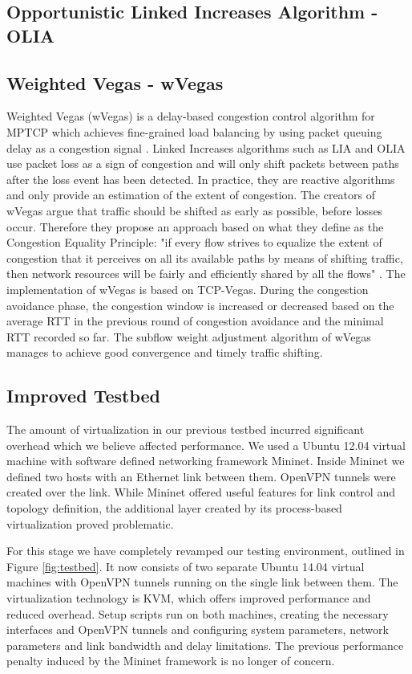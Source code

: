 \subsection{Opportunistic Linked Increases Algorithm - OLIA}
\subsection{Weighted Vegas - wVegas}
Weighted Vegas (wVegas) is a delay-based congestion control algorithm for MPTCP which achieves fine-grained load balancing by using packet queuing delay as a congestion signal \cite{wvegas}. Linked Increases algorithms such as LIA and OLIA use packet loss as a sign of congestion and will only shift packets between paths after the loss event has been detected. In practice, they are reactive algorithms and only provide an estimation of the extent of congestion. The creators of wVegas argue that traffic should be shifted as early as possible, before losses occur. Therefore they propose an approach based on what they define as the Congestion Equality Principle: "if every flow strives to equalize the extent of congestion that it perceives on all its available paths by means of shifting traffic, then network resources will be fairly and efficiently shared by all the flows" \cite{wvegas}.
The implementation of wVegas is based on TCP-Vegas. During the congestion avoidance phase, the congestion window is increased or decreased based on the average RTT in the previous round of congestion avoidance and the minimal RTT recorded so far. The subflow weight adjustment algorithm of wVegas manages to achieve good convergence and timely traffic shifting.
\subsection{Improved Testbed}
The amount of virtualization in our previous testbed incurred significant overhead which we believe affected performance. We used a Ubuntu 12.04 virtual machine with software defined networking framework Mininet. Inside Mininet we defined two hosts with an Ethernet link between them. OpenVPN tunnels were created over the link. While Mininet offered useful features for link control and topology definition, the additional layer created by its process-based virtualization proved problematic.

For this stage we have completely revamped our testing environment, outlined
in Figure \ref{fig:testbed}. It now
consists of two separate Ubuntu 14.04 virtual machines with OpenVPN tunnels
running on the single link between them. The virtualization technology is KVM,
which offers improved performance and reduced overhead. Setup scripts run on
both machines, creating the necessary interfaces and OpenVPN tunnels and
configuring system parameters, network parameters and link bandwidth and delay
limitations. The previous performance penalty induced by the Mininet
framework is no longer of concern.

